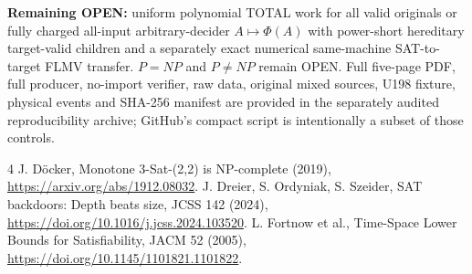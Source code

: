 \documentclass[11pt]{article}
\begin{document}
\noindent\textbf{Remaining OPEN:} uniform polynomial TOTAL work for all valid originals or fully charged all-input arbitrary-decider $A\mapsto\Phi(A)$ with power-short hereditary target-valid children and a separately exact numerical same-machine SAT-to-target FLMV transfer. $P=NP$ and $P\ne NP$ remain OPEN.
Full five-page PDF, full producer, no-import verifier, raw data, original mixed sources, U198 fixture, physical events and SHA-256 manifest are provided in the separately audited reproducibility archive; GitHub's compact script is intentionally a subset of those controls.
\begin{thebibliography}{4}
 J. D\"ocker, Monotone 3-Sat-(2,2) is NP-complete (2019), \url{https://arxiv.org/abs/1912.08032}.
 J. Dreier, S. Ordyniak, S. Szeider, SAT backdoors: Depth beats size, JCSS 142 (2024), \url{https://doi.org/10.1016/j.jcss.2024.103520}.
 L. Fortnow et al., Time-Space Lower Bounds for Satisfiability, JACM 52 (2005), \url{https://doi.org/10.1145/1101821.1101822}.
\end{thebibliography}
\end{document}
